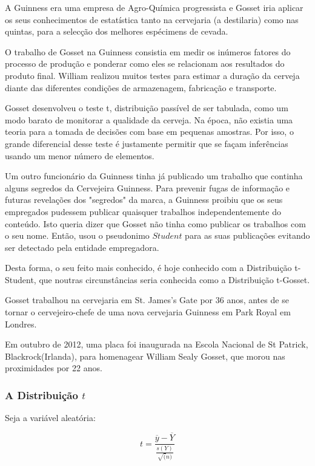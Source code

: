 A Guinness era uma empresa de Agro-Química progressista e Gosset iria aplicar os seus conhecimentos de estatística tanto na cervejaria (a destilaria) como nas quintas, para a selecção dos melhores espécimens de cevada.\vskip0.3cm

O trabalho de Gosset na Guinness consistia em medir os inúmeros fatores do processo de produção e ponderar como eles se relacionam aos resultados do produto final. William realizou muitos testes para estimar a duração da cerveja diante das diferentes condições de armazenagem, fabricação e transporte.\vskip0.3cm


Gosset desenvolveu o teste t, distribuição passível de ser tabulada, como um modo barato de monitorar a qualidade da cerveja. Na época, não existia uma teoria para a tomada de decisões com base em pequenas amostras. Por isso, o grande diferencial desse teste é justamente permitir que se façam inferências usando um menor número de elementos. \vskip0.3cm

Um outro funcionário da Guinness tinha já publicado um trabalho que continha alguns segredos da Cervejeira Guinness. Para prevenir fugas de informação e futuras revelações dos "segredos" da marca, a Guinness proibiu que os seus empregados pudessem publicar quaisquer trabalhos independentemente do conteúdo. Isto queria dizer que Gosset não tinha como publicar os trabalhos com o seu nome. Então, usou o pseudonimo $Student$ para as suas publicações evitando ser detectado pela entidade empregadora. \vskip0.3cm

Desta forma, o seu feito mais conhecido, é hoje conhecido com a Distribuição t-Student, que noutras circunstâncias seria conhecida como a Distribuição t-Gosset.\vskip0.3cm


Gosset trabalhou na cervejaria em St. James's Gate por 36 anos, antes de se tornar o cervejeiro-chefe de uma nova cervejaria Guinness em Park Royal em Londres.\vskip0.3cm

Em outubro de 2012, uma placa foi inaugurada na Escola Nacional de St Patrick, Blackrock(Irlanda), para homenagear William Sealy Gosset, que morou nas proximidades por 22 anos. \vskip0.3cm




\subsubsection{A Distribuição $t$ }

Seja a variável aleatória:

\begin{equation}
    t =\frac{\overline{y}-\overline{Y}}{\frac{s(Y)}{\sqrt(n)}}
\end{equation}

